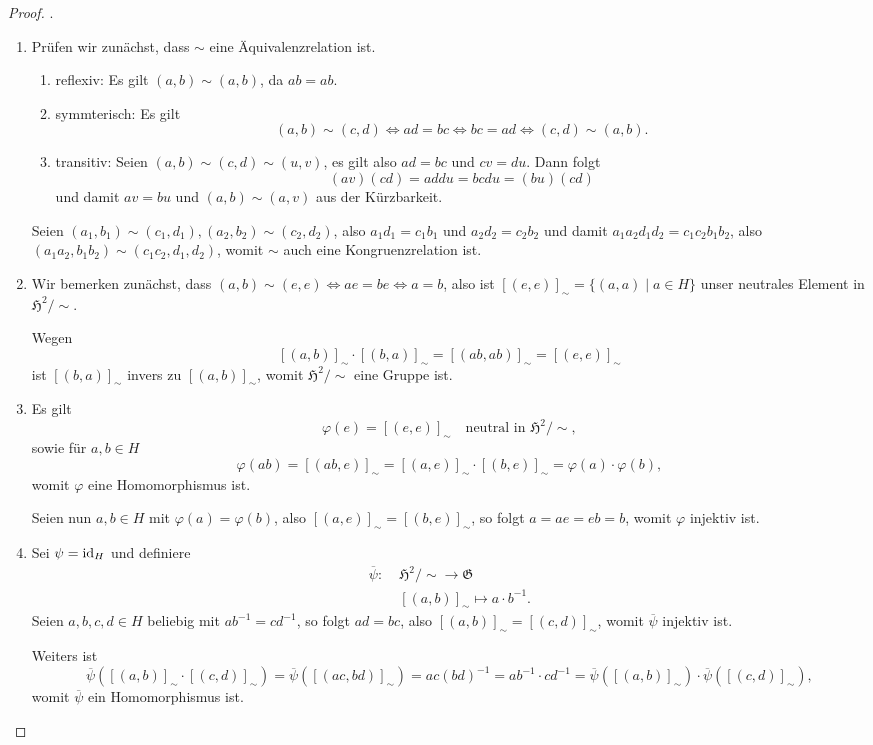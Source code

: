 \begin{proof} .
    \begin{enumerate}
        \item Prüfen wir zunächst, dass $\sim$ eine Äquivalenzrelation ist.
        \begin{enumerate}
            \item reflexiv: Es gilt $(a, b) \sim (a, b)$, da $a b = a b$.
            \item symmterisch: Es gilt
            $$ (a, b) \sim (c, d) \Leftrightarrow a d = b c \Leftrightarrow b c = a d \Leftrightarrow (c, d) \sim (a, b). $$
            \item transitiv: Seien $(a, b) \sim (c, d) \sim (u, v)$, es gilt also $ad = bc$ und $cv = du$. Dann folgt
            $$ (av)(cd) = addu = bcdu = (bu)(cd) $$
            und damit $av = bu$ und $(a, b) \sim (a, v)$ aus der Kürzbarkeit.
        \end{enumerate}
        Seien $(a_1, b_1) \sim (c_1, d_1), (a_2, b_2) \sim (c_2, d_2)$, also $a_1 d_1 = c_1 b_1$ und $a_2 d_2 = c_2 b_2$ und damit $a_1 a_2 d_1 d_2 = c_1 c_2 b_1 b_2$, also $(a_1 a_2, b_1 b_2) \sim (c_1 c_2, d_1, d_2)$, womit $\sim$ auch eine Kongruenzrelation ist.

        \item Wir bemerken zunächst, dass $(a, b) \sim (e, e) \Leftrightarrow ae = be \Leftrightarrow a = b$, also ist $[(e,e)]_\sim = \{ (a, a) \mid a \in H \}$ unser neutrales Element in $\mathfrak{H}^2 / \sim$.
        
        Wegen
        $$ [(a,b)]_\sim \cdot [(b,a)]_\sim = [(ab, ab)]_\sim = [(e,e)]_\sim $$
        ist $[(b,a)]_\sim$ invers zu $[(a,b)]_\sim$, womit $\mathfrak{H}^2 / \sim$ eine Gruppe ist.

        \item Es gilt
        $$ \varphi(e) = [(e,e)]_\sim \quad \textrm{neutral in } \mathfrak{H}^2 / \sim, $$
        sowie für $a, b \in H$
        $$ \varphi(ab) = [(ab, e)]_\sim = [(a,e)]_\sim \cdot [(b,e)]_\sim = \varphi(a) \cdot \varphi(b), $$
        womit $\varphi$ eine Homomorphismus ist.

        Seien nun $a,b \in H$ mit $\varphi(a) = \varphi(b)$, also $[(a,e)]_\sim = [(b,e)]_\sim$, so folgt $a = ae = eb = b$, womit $\varphi$ injektiv ist.

        \item Sei \obda $\psi = \operatorname{id}_H$ und definiere
        \begin{align*}
            \overline{\psi} :\;& \mathfrak{H}^2 / \sim \to \mathfrak{G} \\
            & [(a,b)]_\sim \mapsto a \cdot b^{-1}.
        \end{align*}
        Seien $a,b,c,d \in H$ beliebig mit $a b^{-1} = c d^{-1}$, so folgt $ad = bc$, also $[(a,b)]_\sim = [(c,d)]_\sim$, womit $\overline{\psi}$ injektiv ist.

        Weiters ist
        $$ \overline{\psi}([(a,b)]_\sim \cdot [(c,d)]_\sim) = \overline{\psi}([(ac,bd)]_\sim) = ac (bd)^{-1} = ab^{-1} \cdot cd^{-1} = \overline{\psi}([(a,b)]_\sim) \cdot \overline{\psi}([(c,d)]_\sim), $$
        womit $\overline{\psi}$ ein Homomorphismus ist.
    \end{enumerate}
\end{proof}